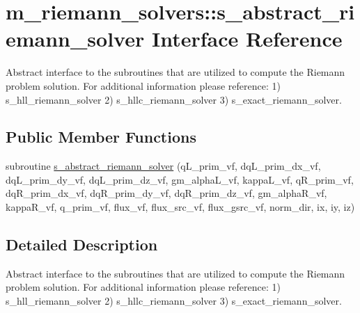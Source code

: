 \hypertarget{interfacem__riemann__solvers_1_1s__abstract__riemann__solver}{}\section{m\+\_\+riemann\+\_\+solvers\+:\+:s\+\_\+abstract\+\_\+riemann\+\_\+solver Interface Reference}
\label{interfacem__riemann__solvers_1_1s__abstract__riemann__solver}


Abstract interface to the subroutines that are utilized to compute the Riemann problem solution. For additional information please reference\+: 1) s\+\_\+hll\+\_\+riemann\+\_\+solver 2) s\+\_\+hllc\+\_\+riemann\+\_\+solver 3) s\+\_\+exact\+\_\+riemann\+\_\+solver.  


\subsection*{Public Member Functions}
\begin{DoxyCompactItemize}
\item 
subroutine \hyperlink{interfacem__riemann__solvers_1_1s__abstract__riemann__solver_ab54b3c177b8ba55e930c859cee028f8f}{s\+\_\+abstract\+\_\+riemann\+\_\+solver} (q\+L\+\_\+prim\+\_\+vf, dq\+L\+\_\+prim\+\_\+dx\+\_\+vf, dq\+L\+\_\+prim\+\_\+dy\+\_\+vf, dq\+L\+\_\+prim\+\_\+dz\+\_\+vf, gm\+\_\+alpha\+L\+\_\+vf, kappa\+L\+\_\+vf, q\+R\+\_\+prim\+\_\+vf, dq\+R\+\_\+prim\+\_\+dx\+\_\+vf, dq\+R\+\_\+prim\+\_\+dy\+\_\+vf, dq\+R\+\_\+prim\+\_\+dz\+\_\+vf, gm\+\_\+alpha\+R\+\_\+vf, kappa\+R\+\_\+vf, q\+\_\+prim\+\_\+vf, flux\+\_\+vf, flux\+\_\+src\+\_\+vf, flux\+\_\+gsrc\+\_\+vf, norm\+\_\+dir, ix, iy, iz)
\end{DoxyCompactItemize}


\subsection{Detailed Description}
Abstract interface to the subroutines that are utilized to compute the Riemann problem solution. For additional information please reference\+: 1) s\+\_\+hll\+\_\+riemann\+\_\+solver 2) s\+\_\+hllc\+\_\+riemann\+\_\+solver 3) s\+\_\+exact\+\_\+riemann\+\_\+solver. 


